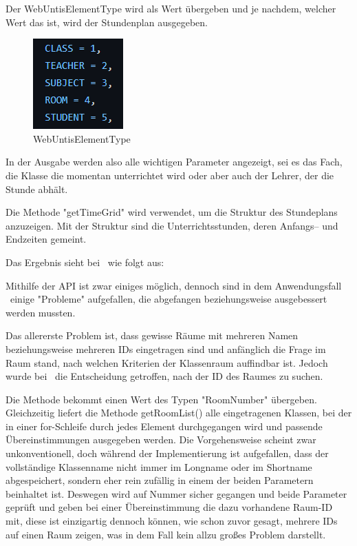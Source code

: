 
Der WebUntisElementType wird als Wert übergeben und je nachdem, welcher Wert das ist, wird der Stundenplan ausgegeben. 

\begin{figure}[H]
    \centering
    \includegraphics{media/WebUntis/WebUntisElementType.png}
    \caption{WebUntisElementType}
\end{figure}


In der Ausgabe werden also alle wichtigen Parameter angezeigt, sei es das Fach, die Klasse die momentan unterrichtet wird oder aber auch der Lehrer, der die Stunde abhält.


Die Methode "getTimeGrid" wird verwendet, um die Struktur des Stundeplans anzuzeigen. Mit der Struktur sind die Unterrichtsstunden, deren Anfangs– und Endzeiten gemeint.


Das Ergebnis sieht bei \ZELIA\ wie folgt aus:



Mithilfe der API ist zwar einiges möglich, dennoch sind in dem Anwendungsfall \ZELIA\ einige "Probleme" aufgefallen, die abgefangen beziehungsweise ausgebessert werden mussten.

Das allererste Problem ist, dass gewisse Räume mit mehreren Namen beziehungsweise mehreren IDs eingetragen sind und anfänglich die Frage im Raum stand, nach welchen Kriterien der Klassenraum auffindbar ist. Jedoch wurde bei \ZELIA\ die Entscheidung getroffen, nach der ID des Raumes zu suchen.



Die Methode bekommt einen Wert des Typen "RoomNumber" übergeben. Gleichzeitig liefert die Methode getRoomList() alle eingetragenen Klassen, bei der in einer for-Schleife durch jedes Element durchgegangen wird und passende Übereinstimmungen ausgegeben werden. Die Vorgehensweise scheint zwar unkonventionell, doch während der Implementierung ist aufgefallen, dass der vollständige Klassenname nicht immer im Longname oder im Shortname abgespeichert, sondern eher rein zufällig in einem der beiden Parametern beinhaltet ist. Deswegen wird auf Nummer sicher gegangen und beide Parameter geprüft und geben bei einer Übereinstimmung die dazu vorhandene Raum-ID mit, diese ist einzigartig dennoch können, wie schon zuvor gesagt, mehrere IDs auf einen Raum zeigen, was in dem Fall kein allzu großes Problem darstellt.

